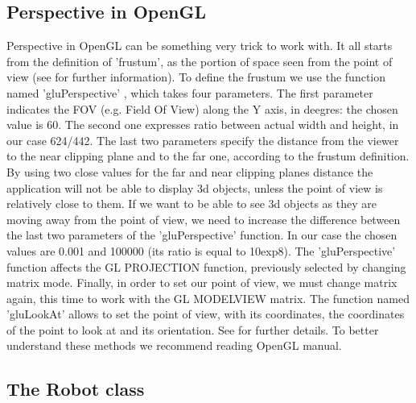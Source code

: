 \subsection{Perspective in OpenGL}

Perspective in OpenGL can be something very trick to work with. It all starts from the definition of 'frustum', as the portion
of space seen from the point of view (see \cite{wiki:frustum} for further information). To define the frustum we use the function
named 'gluPerspective' \cite{opengl:gluPerspective}, which takes four parameters.
\newline The first parameter indicates the FOV (e.g. Field Of View) along the Y axis, in deegres: the chosen value is 60. The
second one expresses ratio between actual width and height, in our case 624/442. The last two parameters specify the distance from
the viewer to the near clipping plane and to the far one, according to the frustum definition.
\newline By using two close values for the far and near clipping planes distance the application will not be able to display 3d
objects, unless the point of view is relatively close to them. If we want to be able to see 3d objects as they are moving away
from the point of view, we need to increase the difference between the last two parameters of the 'gluPerspective' function. In
our case the chosen values are 0.001 and 100000 (its ratio is equal to 10exp8).
\newline The 'gluPerspective' function affects the GL PROJECTION function, previously selected by changing matrix mode. Finally,
in order to set our point of view, we must change matrix again, this time to work with the GL MODELVIEW matrix. The function named
'gluLookAt' allows to set the point of view, with its coordinates, the coordinates of the point to look at and its orientation.
See \cite{opengl:gluLookAt} for further details.
\newline To better understand these methods we recommend reading OpenGL manual.


\subsection{The Robot class}

